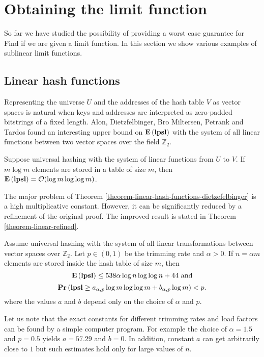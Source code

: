\section{Obtaining the limit function}
\label{section-limit}

So far we have studied the possibility of providing a worst case guarantee for Find if we are given a limit function. 
In this section we show various examples of sublinear limit functions.

\subsection{Linear hash functions}
Representing the universe $U$ and the addresses of the hash table $V$ as vector spaces is natural when keys and addresses are interpreted as zero-padded  bitstrings of a fixed length. Alon, Dietzfelbinger, Bro Miltersen, Petrank and Tardos\cite{DBLP:journals/jacm/AlonDMPT99} found an interesting upper bound on $\mathbf{E}\left(\mathbf{lpsl}\right)$ with the system of all linear functions between two vector spaces over the field $\mathbb{Z}_2$.

\begin{theorem}
\label{theorem-linear-hash-functions-dietzefelbinger}
Suppose universal hashing with the system of linear functions from $U$ to $V$. 
If $m \log m$ elements are stored in a table of size $m$, then $\mathbf{E}\left(\mathbf{lpsl}\right) = \mathcal{O}(\log m \log \log m)$. 
\end{theorem}

The major problem of Theorem \ref{theorem-linear-hash-functions-dietzefelbinger} is a high multiplicative constant. However, it can be significantly reduced by a refinement of the original proof. The improved result is stated in Theorem \ref{theorem-linear-refined}.

\begin{theorem}
\label{theorem-linear-refined}
Assume universal hashing with the system of all linear transformations between vector spaces over $\mathbb{Z}_2$. 
Let $p \in (0, 1)$ be the trimming rate and $\alpha > 0$. 
If $n = \alpha m$ elements are stored inside the hash table of size $m$, then $$\mathbf{E}\left(\mathbf{lpsl}\right) \leq 538 \alpha \log n \log \log n + 44\mbox{ and}$$ $$\mathbf{Pr}\left(\mathbf{lpsl} \geq a_{\alpha, p} \log m \log \log m + b_{\alpha, p}\log m\right) < p.$$ where the values $a$ and $b$ depend only on the choice of $\alpha$ and $p$.
\end{theorem}

Let us note that the exact constants for different trimming rates and load factors can be found by a simple computer program.
For example the choice of $\alpha = 1.5$ and $p = 0.5$ yields $a = 57.29$ and $b = 0$.
In addition, constant $a$ can get arbitrarily close to $1$ but such estimates hold only for large values of $n$.

